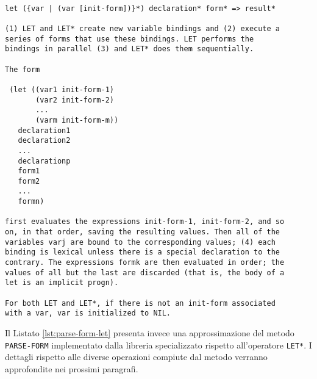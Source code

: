\begin{lstlisting}[caption=Estratto della documentazione relativa al costrutto
\texttt{LET*}]

let ({var | (var [init-form])}*) declaration* form* => result*

(1) LET and LET* create new variable bindings and (2) execute a
series of forms that use these bindings. LET performs the
bindings in parallel (3) and LET* does them sequentially.

The form

 (let ((var1 init-form-1)
       (var2 init-form-2)
       ...
       (varm init-form-m))
   declaration1
   declaration2
   ...
   declarationp
   form1
   form2
   ...
   formn)

first evaluates the expressions init-form-1, init-form-2, and so
on, in that order, saving the resulting values. Then all of the
variables varj are bound to the corresponding values; (4) each
binding is lexical unless there is a special declaration to the
contrary. The expressions formk are then evaluated in order; the
values of all but the last are discarded (that is, the body of a
let is an implicit progn).

For both LET and LET*, if there is not an init-form associated
with a var, var is initialized to NIL.

\end{lstlisting}

Il Listato \ref{lst:parse-form-let} presenta invece una approssimazione del
metodo \texttt{PARSE-FORM} implementato dalla libreria specializzato rispetto
all'operatore \texttt{LET*}. I dettagli rispetto alle diverse operazioni
compiute dal metodo verranno approfondite nei prossimi paragrafi.

